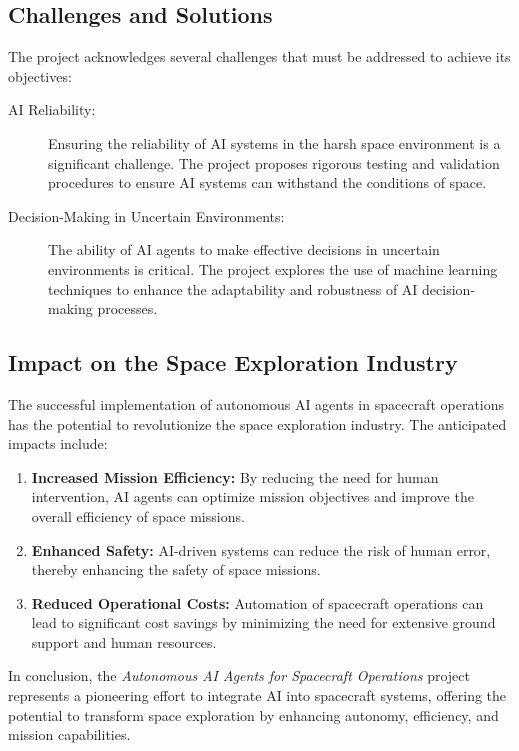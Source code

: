 \documentclass[a4paper, 11pt]{article}
\begin{document}
\subsection{Challenges and Solutions}

The project acknowledges several challenges that must be addressed to achieve its objectives:

\begin{description}
    \item[AI Reliability:] Ensuring the reliability of AI systems in the harsh space environment is a significant challenge. The project proposes rigorous testing and validation procedures to ensure AI systems can withstand the conditions of space.
    \item[Decision-Making in Uncertain Environments:] The ability of AI agents to make effective decisions in uncertain environments is critical. The project explores the use of machine learning techniques to enhance the adaptability and robustness of AI decision-making processes.
\end{description}

\subsection{Impact on the Space Exploration Industry}

The successful implementation of autonomous AI agents in spacecraft operations has the potential to revolutionize the space exploration industry. The anticipated impacts include:

\begin{enumerate}
    \item \textbf{Increased Mission Efficiency:} By reducing the need for human intervention, AI agents can optimize mission objectives and improve the overall efficiency of space missions.
    \item \textbf{Enhanced Safety:} AI-driven systems can reduce the risk of human error, thereby enhancing the safety of space missions.
    \item \textbf{Reduced Operational Costs:} Automation of spacecraft operations can lead to significant cost savings by minimizing the need for extensive ground support and human resources.
\end{enumerate}

In conclusion, the \textit{Autonomous AI Agents for Spacecraft Operations} project represents a pioneering effort to integrate AI into spacecraft systems, offering the potential to transform space exploration by enhancing autonomy, efficiency, and mission capabilities.
\end{document}
